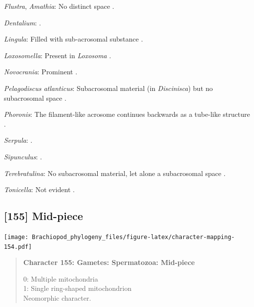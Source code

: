 \documentclass[openany]{book}
\begin{document}
\hypertarget{Amathia-coding-154}{}
\emph{Flustra}, \emph{Amathia}: No distinct space \citep[in
\emph{Tubulipora};][]{Franzen1984}.

\hypertarget{Dentalium-coding-154}{}
\emph{Dentalium}: \citet{DufresneDube1983}.

\hypertarget{Lingula-coding-154}{}
\emph{Lingula}: Filled with sub-acrosomal substance
\citep{Fukumoto2003Theacrosome}.

\hypertarget{Loxosomella-coding-154}{}
\emph{Loxosomella}: Present in \emph{Loxosoma} \citep{Franzen2000}.

\hypertarget{Novocrania-coding-154}{}
\emph{Novocrania}: Prominent \citep{Afzelius1978Finestructure}.

\hypertarget{Pelagodiscus_atlanticus-coding-154}{}
\emph{Pelagodiscus atlanticus}: Subacrosomal material (in
\emph{Discinisca}) but no subacrosomal space
\citep{Hodgson1994Ultrastructureof}.

\hypertarget{Phoronis-coding-154}{}
\emph{Phoronis}: The filament-like acrosome continues backwards as a
tube-like structure \citep[summarized in
\citet{Jamieson1991FishEvolution}]{Franzen1980Ultrastructureof}.

\hypertarget{Serpula-coding-154}{}
\emph{Serpula}: \citet{Gherardi2011}.

\hypertarget{Sipunculus-coding-154}{}
\emph{Sipunculus}: \citet{Rice1993}.

\hypertarget{Terebratulina-coding-154}{}
\emph{Terebratulina}: No subacrosomal material, let alone a subacrosomal
space \citep[e.g.][]{Hodgson1994Ultrastructureof}.

\hypertarget{Tonicella-coding-154}{}
\emph{Tonicella}: Not evident \citep{BucklandNicks1988}.

\subsection*{{[}155{]} Mid-piece}\label{mid-piece}

\texttt{[image: Brachiopod\_phylogeny\_files/figure-latex/character-mapping-154.pdf]}

\begin{quote}
\textbf{Character 155: Gametes: Spermatozoa: Mid-piece}

0: Multiple mitochondria\\
1: Single ring-shaped mitochondrion\\
Neomorphic character.
\end{quote}
\end{document}
